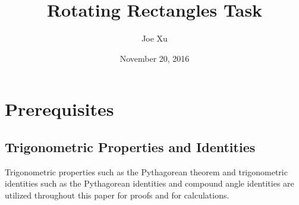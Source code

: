 \documentclass{article}
\title  {Rotating Rectangles Task}
\date   {November 20, 2016}
\author {Joe Xu}
\begin{document}
    \maketitle
    \newpage
        
    
    \section{Prerequisites}
        \subsection{Trigonometric Properties and Identities}
        Trigonometric properties such as the Pythagorean theorem and trigonometric identities such as the Pythagorean identities and compound angle identities are utilized throughout this paper for proofs and for calculations.
\end{document}
